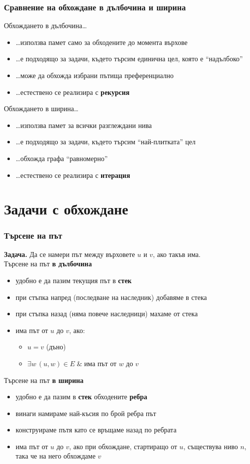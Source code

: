 \documentclass{beamer}
\begin{document}
\begin{frame}
  \frametitle{Сравнение на обхождане в дълбочина и ширина}
  Обхождането в дълбочина\ldots
  \pause
  \begin{itemize}[<+->]
  \item \ldots използва памет само за обходените до момента върхове
  \item \ldots е подходящо за задачи, където търсим единична цел, която е ``надълбоко''
  \item \ldots може да обхожда избрани пътища преференциално
  \item \ldots естествено се реализира с \textbf{рекурсия}
  \end{itemize}
  \onslide<+->
  Обхождането в ширина\ldots
  \begin{itemize}[<+->]
  \item \ldots използва памет за всички разглеждани нива
  \item \ldots е подходящо за задачи, където търсим ``най-плитката'' цел
  \item \ldots обхожда графа ``равномерно''
  \item \ldots естествено се реализира с \textbf{итерация}
  \end{itemize}
\end{frame}

\section{Задачи с обхождане}

\begin{frame}
  \frametitle{Търсене на път}
  \textbf{Задача. } Да се намери път между върховете $u$ и $v$, ако такъв има.\\\pause
  Търсене на път \textbf{в дълбочина}
  \pause
  \begin{itemize}[<+->]
  \item удобно е да пазим текущия път в \textbf{стек}
  \item при стъпка напред (последване на наследник) добавяме в стека
  \item при стъпка назад (няма повече наследници) махаме от стека
  \item има път от $u$ до $v$, ако:
    \begin{itemize}
    \item $u = v$ (дъно)
    \item $\exists w\, (u,w)\in E\;\&\;$има път от $w$ до $v$
    \end{itemize}
  \end{itemize}
  \onslide<+->
  Търсене на път \textbf{в ширина}
  \begin{itemize}[<+->]
  \item удобно е да пазим в \textbf{стек} обходените \textbf{ребра}
  \item винаги намираме най-късия по брой ребра път
  \item конструираме пътя като се връщаме назад по ребрата
  \item има път от $u$ до $v$, ако при обхождане, стартиращо от $u$, съществува  ниво $n$, така че на него обхождаме $v$
  \end{itemize}
\end{frame}
\end{document}
